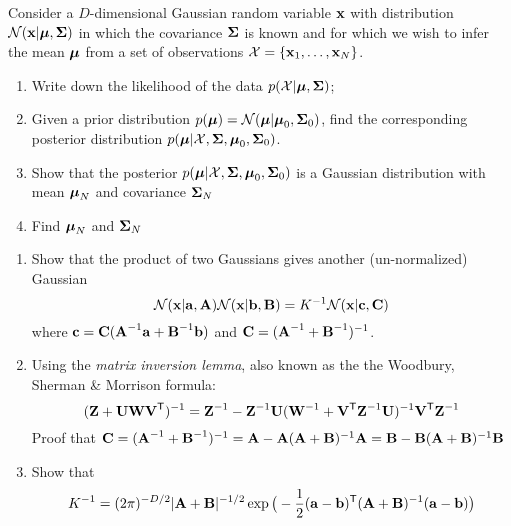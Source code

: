 \documentclass{amsml}
\begin{document}
\begin{problem}
Consider a $D$-dimensional Gaussian random variable $\bm{\mathbf{x}}$ with distribution $\mathcal{N}(\bm{\mathbf{x}}|\bm{\mathbf{\mu}},\bm{\mathbf{\Sigma}})$ in which the covariance $\bm{\mathbf{\Sigma}}$ is known and for which we wish to infer the mean $\bm{\mathbf{\mu}}$ from a set of observations $\mathcal{X}=\{\bm{\mathbf{x}}_1,\dotsc,\bm{\mathbf{x}}_N\}$. 
\begin{enumerate}
\item Write down the likelihood of the data $p(\mathcal{X}|\bm{\mathbf{\mu}},\bm{\mathbf{\Sigma}})$;
\item Given a prior distribution $p(\bm{\mathbf{\mu}})=\mathcal{N}(\bm{\mathbf{\mu}}|\bm{\mathbf{\mu}}_0,\bm{\mathbf{\Sigma}}_0)$, find the corresponding posterior distribution $p(\bm{\mathbf{\mu}}|\mathcal{X},\bm{\mathbf{\Sigma}},\bm{\mathbf{\mu}}_0,\bm{\mathbf{\Sigma}}_0)$.
\item Show that the posterior $p(\bm{\mathbf{\mu}}|\mathcal{X},\bm{\mathbf{\Sigma}},\bm{\mathbf{\mu}}_0,\bm{\mathbf{\Sigma}}_0)$ is a Gaussian distribution with mean $\bm{\mathbf{\mu}}_N$ and covariance $\bm{\mathbf{\Sigma}}_N$
\item Find $\bm{\mathbf{\mu}}_N$ and $\bm{\mathbf{\Sigma}}_N$
\end{enumerate}
\end{problem}
\begin{problem}

\begin{enumerate}
\item Show that the product of two Gaussians gives another (un-normalized) Gaussian
$$
\mathcal{N}(\bm{\mathbf{x}}|\bm{\mathbf{a}},\bm{\mathbf{A}})\mathcal{N}(\bm{\mathbf{x}}|\bm{\mathbf{b}},\bm{\mathbf{B}}) = K^{-1}\mathcal{N}(\bm{\mathbf{x}}|\bm{\mathbf{c}},\bm{\mathbf{C}})
$$
where $\bm{\mathbf{c}}=\bm{\mathbf{C}}(\bm{\mathbf{A}}^{-1}\bm{\mathbf{a}} + \bm{\mathbf{B}}^{-1}\bm{\mathbf{b}})$ and $\bm{\mathbf{C}}=(\bm{\mathbf{A}}^{-1}+\bm{\mathbf{B}}^{-1})^{-1}$.
\item Using the \emph{matrix inversion lemma}, also known as the the Woodbury, Sherman \& Morrison formula: 
\begin{equation}
(\bm{\mathbf{Z}}+\bm{\mathbf{U}}\bm{\mathbf{W}}\bm{\mathbf{V}}^{\mathsf{T}})^{-1} = \bm{\mathbf{Z}}^{-1} - \bm{\mathbf{Z}}^{-1}\bm{\mathbf{U}}(\bm{\mathbf{W}}^{-1}+\bm{\mathbf{V}}^{\mathsf{T}} \bm{\mathbf{Z}}^{-1}\bm{\mathbf{U}})^{-1}\bm{\mathbf{V}}^{\mathsf{T}} \bm{\mathbf{Z}}^{-1}
\end{equation}
Proof that $\bm{\mathbf{C}} = (\bm{\mathbf{A}}^{-1}+\bm{\mathbf{B}}^{-1})^{-1}=\bm{\mathbf{A}} - \bm{\mathbf{A}}(\bm{\mathbf{A}}+\bm{\mathbf{B}})^{-1}\bm{\mathbf{A}} = \bm{\mathbf{B}} - \bm{\mathbf{B}}(\bm{\mathbf{A}}+\bm{\mathbf{B}})^{-1}\bm{\mathbf{B}}$

\item Show that
\begin{equation}
K^{-1} = (2\pi)^{-D/2}|\bm{\mathbf{A}}+\bm{\mathbf{B}}|^{-1/2} \exp\big( -\frac{1}{2}(\bm{\mathbf{a}}-\bm{\mathbf{b}})^{\mathsf{T}} (\bm{\mathbf{A}}+\bm{\mathbf{B}})^{-1} (\bm{\mathbf{a}}-\bm{\mathbf{b}})\big)
\end{equation}
\end{enumerate}
\end{problem}
\end{document}
